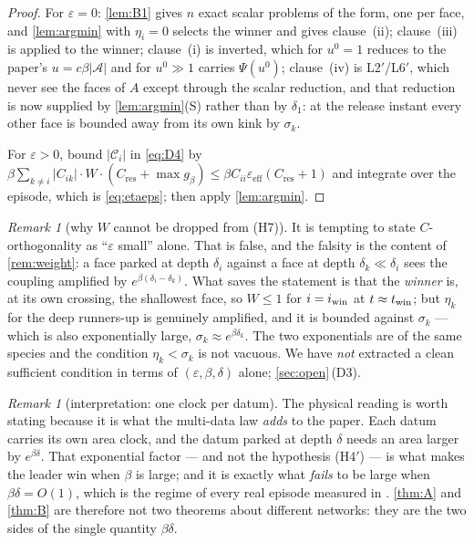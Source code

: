 \documentclass[11pt]{article}
\theoremstyle{remark}
\newtheorem{remark}[theorem]{Remark}
\newcommand{\Ar}{\mathcal{A}}
\newcommand{\Cres}{C_{\mathrm{res}}}
\newcommand{\hyplabel}[1]{\textup{(#1)}}
\begin{document}
\begin{proof}
For $\varepsilon=0$: \cref{lem:B1} gives $n$ exact scalar problems of the
\cite[L1$'$/L4$'$]{paper} form, one per face, and \cref{lem:argmin} with
$\eta_i=0$ selects the winner and gives clause~(ii); clause~(iii) is
\cite[L4$'$(ii)]{paper} applied to the winner; clause~(i) is
\cite[L4$'$(i)]{paper} inverted, which for $u^0=1$ reduces to the paper's
$u=c\beta|\Ar|$ and for $u^0\gg1$ carries $\Psi(u^0)$; clause~(iv) is
L2$'$/L6$'$, which never see the faces of $A$ except through the scalar
reduction, and that reduction is now supplied by \cref{lem:argmin}(S) rather
than by $\delta_1$: at the release instant every other face is bounded away from
its own kink by $\sigma_k$.

For $\varepsilon>0$, bound $|\mathcal C_i|$ in \eqref{eq:D4} by
$\beta\sum_{k\ne i}|C_{ik}|\cdot W\cdot(\Cres+\max g_\beta)
\le\beta C_{ii}\varepsilon_{\mathrm{eff}}(\Cres+1)$ and integrate over the
episode, which is \eqref{eq:etaeps}; then apply \cref{lem:argmin}.
\end{proof}

\begin{remark}[why $W$ cannot be dropped from \hyplabel{H7}]\label{rem:whyW}
It is tempting to state $C$-orthogonality as ``$\varepsilon$ small'' alone. That
is false, and the falsity is the content of \cref{rem:weight}: a face parked at
depth $\delta_i$ against a face at depth $\delta_k\ll\delta_i$ sees the coupling
amplified by $e^{\beta(\delta_i-\delta_k)}$. What saves the statement is that
the \emph{winner} is, at its own crossing, the shallowest face, so $W\le1$ for
$i=i_{\rm win}$ at $t\approx t_{\rm win}$; but $\eta_k$ for the deep runners-up
is genuinely amplified, and it is bounded against $\sigma_k$ --- which is also
exponentially large, $\sigma_k\approx e^{\beta\delta_k}$. The two exponentials
are of the same species and the condition $\eta_k<\sigma_k$ is not vacuous. We
have \emph{not} extracted a clean sufficient condition in terms of
$(\varepsilon,\beta,\delta)$ alone; \cref{sec:open}\,(D3).
\end{remark}

\begin{remark}[interpretation: one clock per datum]
The physical reading is worth stating because it is what the multi-data law
\emph{adds} to the paper. Each datum carries its own area clock, and the datum
parked at depth $\delta$ needs an area larger by $e^{\beta\delta}$. That
exponential factor --- and not the hypothesis \hyplabel{H4$'$} --- is what makes
the leader win when $\beta$ is large; and it is exactly what \emph{fails} to be
large when $\beta\delta=O(1)$, which is the regime of every real episode
measured in \cite[\S3]{scoping}. \cref{thm:A} and \cref{thm:B} are therefore
not two theorems about different networks: they are the two sides of the single
quantity $\beta\delta$.
\end{remark}
\end{document}
